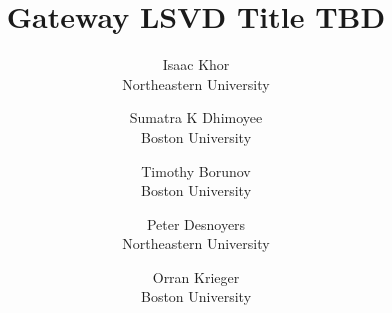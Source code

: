 \documentclass[letterpaper,twocolumn,10pt]{article}
\begin{document}
\date{}

\title{\Large \bf 
Gateway LSVD Title TBD\\}

\author{
{\rm Isaac Khor}\\
Northeastern University
\and
{\rm Sumatra K Dhimoyee}\\
Boston University
\and
{\rm Timothy Borunov}\\
Boston University
\and
{\rm Peter Desnoyers}\\
Northeastern University
\and
{\rm Orran Krieger}\\
Boston University
}

\maketitle















\end{document}
